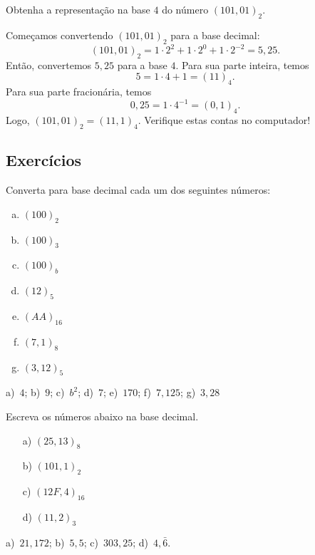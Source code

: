\begin{exeresol}
  Obtenha a representação na base $4$ do número $(101,01)_2$.
\end{exeresol}
\begin{resol}
  Começamos convertendo $(101,01)_2$ para a base decimal:
  \begin{equation}
    (101,01)_2 = 1\cdot 2^2 + 1\cdot 2^0 + 1\cdot 2^{-2} = 5,25.
  \end{equation}
Então, convertemos $5,25$ para a base $4$. Para sua parte inteira, temos
\begin{equation}
  5 = 1\cdot 4 + 1 = (11)_4.
\end{equation}
Para sua parte fracionária, temos
\begin{equation}
  0,25 = 1\cdot 4^{-1} = (0,1)_4.
\end{equation}
Logo, $(101,01)_2 = (11,1)_4$. Verifique estas contas no computador!
\end{resol}

\subsection*{Exercícios}

\indent
\begin{exer} Converta para base decimal cada um dos seguintes números:
    \begin{enumerate}[a)]
    \item $(100)_2$
    \item $(100)_3$
    \item $(100)_b$
    \item $(12)_5$
    \item $(AA)_{16}$
    \item $(7,1)_8$
    \item $(3,12)_5$
    \end{enumerate}
\end{exer}
\begin{resp}
   a)~$4$; b)~$9$; c)~$b^2$; d)~$7$; e)~$170$; f)~$7,125$; g)~$3,28$
\end{resp}

\begin{exer}Escreva os números abaixo na base decimal.
  \begin{enumerate}[a)]
  \item[a)] $(25,13)_8$
  \item[b)] $(101,1)_2$
  \item[c)] $(12F,4)_{16}$
  \item[d)] $(11,2)_{3}$
  \end{enumerate}
\end{exer}
\begin{resp}
  a)~$21,172$; b)~$5,5$; c)~$303,25$; d)~$4,\bar{6}$.
\end{resp}

